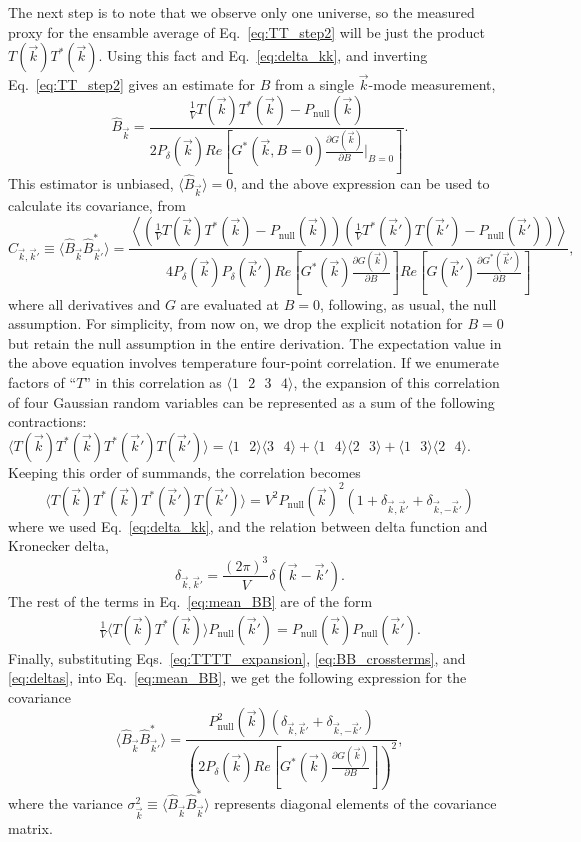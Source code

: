 \documentclass[12pt]{paper}
\newcommand{\beq}{\begin{equation}}
\newcommand{\eeq}{\end{equation}}
\newcommand{\bga}{\begin{gathered}}
\newcommand{\ega}{\end{gathered}}
\begin{document}
The next step is to note that we observe only one universe, so the measured proxy for the ensamble average of Eq.~\ref{eq:TT_step2} will be just the product $T(\vec k)T^*(\vec k)$.  Using this fact and Eq.~\ref{eq:delta_kk}, and inverting Eq.~\ref{eq:TT_step2} gives an estimate for $B$ from a single $\vec k$-mode measurement,
\beq
\widehat B_{\vec k} = \frac{\frac{1}{V}T(\vec k)T^*(\vec k) - P_\text{null}(\vec k)}{2P_{\delta}(\vec k)Re\left[G^*(\vec k,B=0)\frac{\partial G(\vec k)}{\partial B}\bigg|_{B=0}\right]}.
\label{eq:hatBk}
\eeq 
This estimator is unbiased, $\langle \widehat B_{\vec k}\rangle=0$, and the above expression can be used to calculate its covariance, from
\beq
C_{\vec k,\vec k'} \equiv \langle \widehat B_{\vec k}\widehat B^*_{\vec k'}\rangle = 
\frac{\left\langle\left(\frac{1}{V}T(\vec k)T^*(\vec k) - P_\text{null}(\vec k)\right)\left(\frac{1}{V}T^*(\vec k')T(\vec k') - P_\text{null}(\vec k')\right)\right\rangle}{4P_{\delta}(\vec k)P_{\delta}(\vec k')Re\left[G^*(\vec k)\frac{\partial G(\vec k)}{\partial B}\right]Re\left[G(\vec k')\frac{\partial G^*(\vec k')}{\partial B}\right]},
\label{eq:mean_BB}
\eeq
where all derivatives and $G$ are evaluated at $B=0$, following, as usual, the null assumption. For simplicity, from now on, we drop the explicit notation for $B=0$ but retain the null assumption in the entire derivation.  The expectation value in the above equation involves temperature four-point correlation. If we enumerate factors of ``$T$'' in this correlation as $\langle 1\text{ }2\text{ }3\text{ }4\rangle$, the expansion of this correlation of four Gaussian random variables can be represented as a sum of the following contractions: $\langle T(\vec k)T^*(\vec k)T^*(\vec k')T(\vec k') \rangle=\langle1\text{ }2\rangle\langle3\text{ }4\rangle+
\langle1\text{ }4\rangle\langle2\text{ }3\rangle+\langle1\text{ }3\rangle\langle2\text{ }4\rangle$. Keeping this order of summands, the correlation becomes
\beq
\langle T(\vec k)T^*(\vec k)T^*(\vec k')T(\vec k') \rangle = V^2P_\text{null}(\vec k)^2\left( 1+\delta_{\vec k,\vec k'}+\delta_{\vec k,-\vec k'}\right)
\label{eq:TTTT_expansion}
\eeq
where we used Eq.~\ref{eq:delta_kk}, and the relation between delta function and Kronecker delta,
\beq
\delta_{\vec k,\vec k'} = \frac{(2\pi)^3}{V}\delta(\vec k-\vec k').
\label{eq:deltas}
\eeq
The rest of the terms in Eq.~\ref{eq:mean_BB} are of the form
\beq
\bga
\frac{1}{V}\langle T(\vec k)T^*(\vec k)\rangle P_\text{null}(\vec k') =  P_\text{null}(\vec k)P_\text{null}(\vec k').
\ega
\label{eq:BB_crossterms}
\eeq
Finally, substituting Eqs.~\ref{eq:TTTT_expansion}, \ref{eq:BB_crossterms}, and \ref{eq:deltas}, into Eq.~\ref{eq:mean_BB}, we get the following expression for the covariance
\beq
\langle \widehat B_{\vec k}\widehat B^*_{\vec k'}\rangle = \frac{P_\text{null}^2(\vec k)\left(\delta_{\vec k,\vec k'}  + \delta_{\vec k,-\vec k'} \right)}{\left(2P_{\delta}(\vec k)Re\left[G^*(\vec k)\frac{\partial G(\vec k)}{\partial B}\right]\right)^2},
\label{eq:B_covariance}
\eeq
where the variance $\sigma^2_{\vec k}\equiv\langle \widehat B_{\vec k}\widehat B^*_{\vec k}\rangle $ represents diagonal elements of the covariance matrix.
\end{document}
